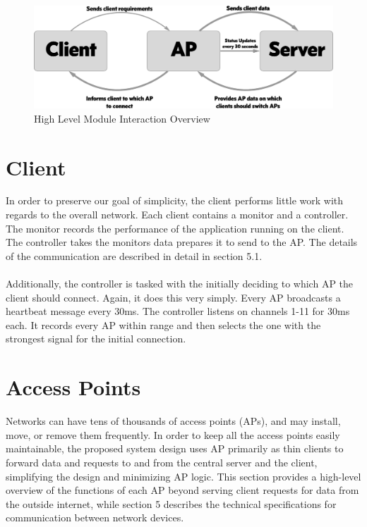 \documentclass[10pt,journal,compsoc]{IEEEtran}
\begin{document}
        \begin{figure}
            \includegraphics[width=\linewidth]{overviewDiagram.png}
            \caption{High Level Module Interaction Overview}
            \label{fig:overview}
        \end{figure}
		
		
		\section{Client}
		In order to preserve our goal of simplicity, the client performs little work with regards to the overall network. Each client contains a monitor and a controller. The monitor records the performance of the application running on the client. The controller takes the monitors data prepares it to send to the AP. The details of the communication are described in detail in section 5.1.\\
		\\
		Additionally, the controller is tasked with the initially deciding to which AP the client should connect. Again, it does this very simply. Every AP broadcasts a heartbeat message every 30ms. The controller listens on channels 1-11 for 30ms each. It records every AP within range and then selects the one with the strongest signal for the initial connection.
		
		\section{Access Points}
		Networks can have tens of thousands of access points (APs), and may install, move, or remove them frequently. In order to keep all the access points easily maintainable, the proposed system design uses AP primarily as thin clients to forward data and requests to and from the central server and the client, simplifying the design and minimizing AP logic. This section provides a high-level overview of the functions of each AP beyond serving client requests for data from the outside internet, while section 5 describes the technical specifications for communication between network devices.
		
\end{document}
